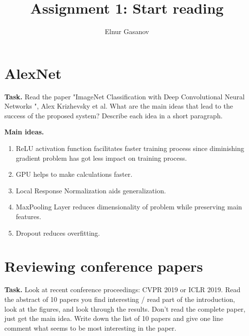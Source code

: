 \documentclass{article}
\title{Assignment 1: Start reading}
\author{Elnur Gasanov}
\date{}
\begin{document}
\maketitle

\section{AlexNet}

{\bfseries Task.} Read the paper "ImageNet Classification with Deep Convolutional Neural Networks ",  Alex Krizhevsky et al. What are the main ideas that lead to the success of the proposed system? Describe each idea in a short paragraph.

{\bfseries Main ideas.} 
\begin{enumerate}
	\item ReLU activation function facilitates faster training process since diminishing gradient problem has got less impact on training process.
	\item GPU helps to make calculations faster.
	\item Local Response Normalization aids generalization.
	\item MaxPooling Layer reduces dimensionality of problem while preserving main features.
	\item Dropout reduces overfitting.
\end{enumerate}

\section{Reviewing conference papers}
{\bfseries Task.} Look at recent conference proceedings: CVPR 2019 or ICLR 2019. Read the abstract of 10 papers you find interesting / read part of the introduction, look at the figures, and look through the results. Don't read the complete paper, just get the main idea. Write down the list of 10 papers and give one line comment what seems to be most interesting in the paper.
\end{document}

